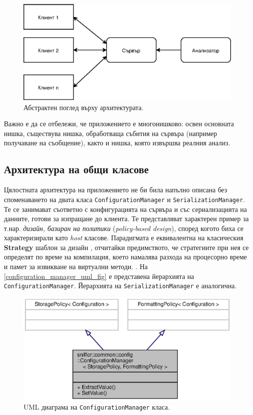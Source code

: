 \documentclass[12pt,a4paper,oneside]{book}
\begin{document}
\begin{figure}[h!]
  \centering
  \includegraphics[scale=.7]{figures/client_server_abstract.eps}
  \caption{Абстрактен поглед върху архитектурата.}
  \label{client_server_abstract_fig}
\end{figure}

Важно е да се отбележи, че приложението е многонишково: освен основната нишка,
съществува нишка, обработваща събития на сървъра (например получаване на
съобщение), както и нишка, която извършва реалния анализ.

\subsection{Архитектура на общи класове}

Цялостната архитектура на приложението не би била напълно описана без
споменаването на двата класа \texttt{ConfigurationManager} и
\texttt{SerializationManager}. Те се
занимават съответно с конфигурацията на сървъра и със сериализацията на данните,
готови за изпращане до клиента. Те представляват характерен пример за т.нар.
\textit{дизайн, базиран на политики} (\textit{policy-based design}),
според когото биха се характеризирали като \textit{host} класове.  Парадигмата е
еквивалентна на класическия \textbf{Strategy} шаблон за дизайн \cite{gamma_design_1995},
отчитайки предимството, че стратегиите
при нея се определят по време на компилация, което намалява разхода на
процесорно време и памет за извикване на виртуални методи.
\cite{alexandrescu_modern_2001}.  На \autoref{configuration_manager_uml_fig} е
представена йерархията на \texttt{ConfigurationManager}. Йерархията на
\texttt{SerializationManager} е аналогична.

\begin{figure}[h!]
  \centering
  \includegraphics[scale=.7]{figures/configuration_manager_uml.eps}
  \caption{UML диаграма на \texttt{ConfigurationManager} класа.}
  \label{configuration_manager_uml_fig}
\end{figure}
\end{document}
